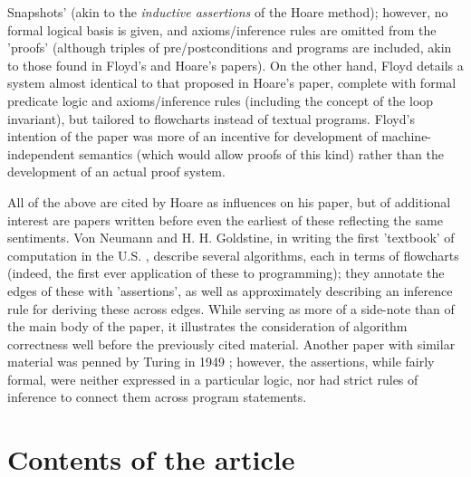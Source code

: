 \documentclass[11pt]{article}
\begin{document}
Snapshots' (akin to the \textit{inductive assertions} of the Hoare method);
however, no formal logical basis is given, and axioms/inference rules
are omitted from the 'proofs' (although triples of pre/postconditions and
programs are included, akin to those found in Floyd's and Hoare's papers). On
the other hand, Floyd details a system almost identical to that proposed in
Hoare's paper, complete with formal predicate logic and axioms/inference rules
(including the concept of the loop invariant), but tailored to flowcharts
instead of textual programs. Floyd's intention of the paper was more of an
incentive for development of machine-independent semantics (which would allow
proofs of this kind) rather than the development of an actual proof system. 
\par
All of the above are cited by Hoare as influences on his paper, but of
additional interest are papers written before even the earliest of these
reflecting the same sentiments. Von Neumann and H. H. Goldstine, in
writing the first 'textbook' of computation in the U.S.
\cite{goldstine1947planning}, describe several algorithms, each in terms of
flowcharts (indeed, the first ever application of these to programming); they
annotate the edges of these with 'assertions', as well as approximately
describing an inference rule for deriving these across edges. While serving as
more of a side-note than of the main body of the paper, it illustrates the
consideration of algorithm correctness well before the previously cited
material. Another paper with similar material was penned by Turing in 1949
\cite{turing1989checking}; however, the assertions, while fairly formal, were
neither expressed in a particular logic, nor had strict rules of inference to
connect them across program statements. 
\par

\section{Contents of the article}
\end{document}
